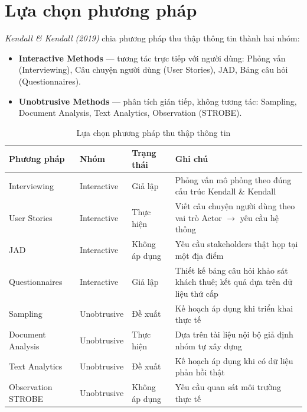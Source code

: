 \documentclass[12pt,a4paper]{report}
\begin{document}
\section{Lựa chọn phương pháp}

\emph{Kendall \& Kendall (2019)} chia phương pháp thu thập thông tin thành hai nhóm:

\begin{itemize}[leftmargin=1.2em,itemsep=2pt]
  \item \textbf{Interactive Methods} — tương tác trực tiếp với người dùng: Phỏng vấn (Interviewing), Câu chuyện người dùng (User Stories), JAD, Bảng câu hỏi (Questionnaires).
  \item \textbf{Unobtrusive Methods} — phân tích gián tiếp, không tương tác: Sampling, Document Analysis, Text Analytics, Observation (STROBE).
\end{itemize}

\begin{table}[H]
  \centering
  \caption{Lựa chọn phương pháp thu thập thông tin}
  \label{tab:ig_methods}
  \begin{tabular}{@{}p{3.6cm}p{2.6cm}p{2.4cm}p{5.4cm}@{}}
    \toprule
    \textbf{Phương pháp} & \textbf{Nhóm} & \textbf{Trạng thái} & \textbf{Ghi chú} \\
    \midrule
    Interviewing & Interactive & Giả lập & Phỏng vấn mô phỏng theo đúng cấu trúc Kendall \& Kendall \\
    \addlinespace
    User Stories & Interactive & Thực hiện & Viết câu chuyện người dùng theo vai trò Actor $\rightarrow$ yêu cầu hệ thống \\
    \addlinespace
    JAD & Interactive & Không áp dụng & Yêu cầu stakeholders thật họp tại một địa điểm \\
    \addlinespace
    Questionnaires & Interactive & Giả lập & Thiết kế bảng câu hỏi khảo sát khách thuê; kết quả dựa trên dữ liệu thứ cấp \\
    \addlinespace
    Sampling & Unobtrusive & Đề xuất & Kế hoạch áp dụng khi triển khai thực tế \\
    \addlinespace
    Document Analysis & Unobtrusive & Thực hiện & Dựa trên tài liệu nội bộ giả định nhóm tự xây dựng \\
    \addlinespace
    Text Analytics & Unobtrusive & Đề xuất & Kế hoạch áp dụng khi có dữ liệu phản hồi thật \\
    \addlinespace
    Observation STROBE & Unobtrusive & Không áp dụng & Yêu cầu quan sát môi trường thực tế \\
    \bottomrule
  \end{tabular}
\end{table}
\end{document}
